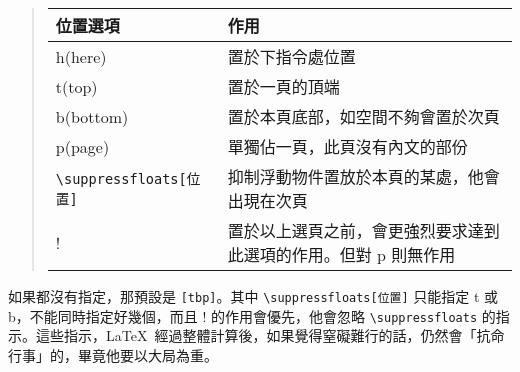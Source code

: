 \begin{quote}
  \begin{tabular}{>{\ttfamily }lp{24em}}
    位置選項                 & 作用                                                                        \\
    \hline
    h(here)                  & 置於下指令處位置                                                            \\
    t(top)                   & 置於一頁的頂端                                                              \\
    b(bottom)                & 置於本頁底部，如空間不夠會置於次頁                                          \\
    p(page)                  & 單獨佔一頁，此頁沒有內文的部份                                              \\
    \verb|\suppressfloats[位置]| & 抑制浮動物件置放於本頁的某處，他會出現在次頁                                \\
    !                        & 置於以上選頁之前，會更強烈要求達到此選項的作用。但對 {\ttfamily p} 則無作用
  \end{tabular}
\end{quote}

如果都沒有指定，那預設是 \verb|[tbp]|。其中 \verb|\suppressfloats[位置]| 只能指定 {\ttfamily t} 或 {\ttfamily b}，不能同時指定好幾個，而且 {\ttfamily !} 的作用會優先，他會忽略 \verb|\suppressfloats| 的指示。這些指示，\LaTeX\ 經過整體計算後，如果覺得窒礙難行的話，仍然會「抗命行事」的，畢竟他要以大局為重。
